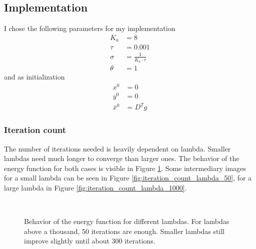 \documentclass{paper}
\begin{document}
\subsection*{Implementation}
I chose the following parameters for my implementation
\begin{align}
	K_a 	&= 8 \\
	\tau 	&= 0.001 \label{eq:tau} \\
	\sigma  &= \frac{1}{K_a \cdot \tau} \\
	\theta  &= 1
\end{align}
and as initialization
\begin{align}
	x^0 &= 0 \\
	y^0 &= 0 \\
	\bar{x}^{0} &= D^T g
\end{align}
\subsubsection*{Iteration count}
The number of iterations needed is heavily dependent on lambda. 
Smaller lambdas need much longer to converge than larger ones. 
The behavior of the energy function for both cases is visible in Figure \ref{fig:energy_plots}. 
Some intermediary images for a small lambda can be seen in Figure \ref{fig:iteration_count_lambda_50}, for a large lambda in Figure \ref{fig:iteration_count_lambda_1000}.
\begin{figure}[ht!]%
\centering
{}
 \\
\caption{Behavior of the energy function for different lambdas. For lambdas above 
a thousand, 50 iterations are enough. Smaller lambdas still improve slightly until about 300 iterations.}
\label{fig:energy_plots}
\end{figure}
\end{document}
